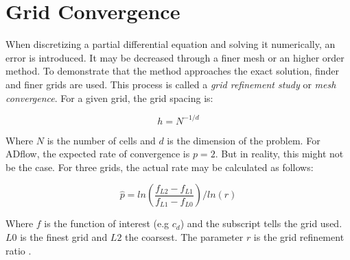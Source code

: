 \section{Grid Convergence}
When discretizing a partial differential equation and solving it numerically, an
error is introduced. It may be decreased through a finer mesh or an higher order
method. To demonstrate that the method approaches the exact solution, finder and
finer grids are used. This process is called a \textit{grid refinement study} or
\textit{mesh convergence}. For a given grid, the grid spacing is:

\begin{equation}
  h = N^{-1/d}
\end{equation}

\noindent Where $N$ is the number of cells and $d$ is the dimension of the
problem.
For ADflow, the expected rate of convergence is $p=2$. But in reality, this
might not be the case. For three grids, the actual rate may be calculated as
follows:

\begin{equation}
  \hat p = ln(\frac{f_{L2} - f_{L1}}{f_{L1} - f_{L0}}) / ln(r)
  \label{eq:conv_rate}
\end{equation}

\noindent Where $f$ is the function of interest (e.g $c_{d}$) and the subscript
tells the grid used. $L0$ is the finest grid and $L2$ the coarsest. The
parameter $r$ is the grid refinement ratio \cite{grid_refinement}.
